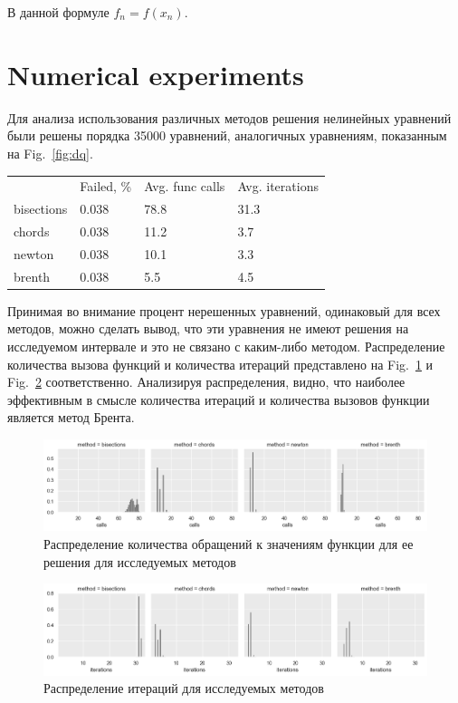 \documentclass[
11pt,%
tightenlines,%
twoside,%
onecolumn,%
nofloats,%
nobibnotes,%
nofootinbib,%
superscriptaddress,%
noshowpacs,%
centertags]%
{revtex4}
\begin{document}
В данной формуле $f_n=f(x_n)$.

\section{Numerical experiments}

Для анализа использования различных методов решения нелинейных уравнений были решены порядка 35000 уравнений, аналогичных уравнениям, показанным на Fig.~\ref{fig:dq}.
\newpage

\begin{table}[ht!]
\begin{tabular}{llll}
           & Failed, \% & Avg. func calls & Avg. iterations \\
bisections & 0.038      & 78.8            & 31.3            \\
chords     & 0.038      & 11.2            & 3.7             \\
newton     & 0.038      & 10.1            & 3.3             \\
brenth     & 0.038      & 5.5             & 4.5            
\end{tabular}
\end{table}

Принимая во внимание процент нерешенных уравнений, одинаковый для всех методов, можно сделать вывод, что эти уравнения не имеют решения на исследуемом интервале и это не связано с каким-либо методом. Распределение количества вызова функций и количества итераций представлено на Fig.~\ref{fig:calls} и Fig.~\ref{fig:iterations} соответственно. Анализируя распределения, видно, что наиболее эффективным в смысле количества итераций и количества вызовов функции является метод Брента.

\begin{figure}[h!]
\setcaptionmargin{5mm}
\onelinecaptionstrue
\includegraphics[width=1\textwidth]{pics/mi_tm5.f.data_calls.png}
\caption{Распределение количества обращений к значениям функции для ее решения для исследуемых методов}\label{fig:calls}
\end{figure}

\begin{figure}[h!]
\setcaptionmargin{5mm}
\onelinecaptionstrue
\includegraphics[width=1\textwidth]{pics/mi_tm5.f.data_iterations.png}
\caption{Распределение итераций для исследуемых методов}\label{fig:iterations}
\end{figure}
\end{document}
